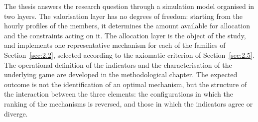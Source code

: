 The thesis answers the research question through a simulation model organised in two layers. The valorisation layer has no degrees of freedom: starting from the hourly profiles of the members, it determines the amount available for allocation and the constraints acting on it. The allocation layer is the object of the study, and implements one representative mechanism for each of the families of Section~\ref{sec:2.2}, selected according to the axiomatic criterion of Section~\ref{sec:2.5}. The operational definition of the indicators and the characterisation of the underlying game are developed in the methodological chapter. The expected outcome is not the identification of an optimal mechanism, but the structure of the interaction between the three elements: the configurations in which the ranking of the mechanisms is reversed, and those in which the indicators agree or diverge.
